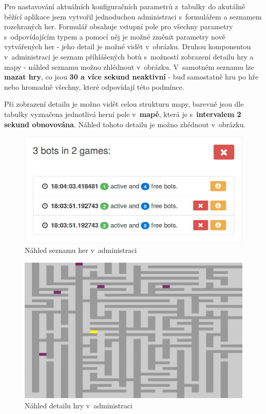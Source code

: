 Pro nastavování aktuálních konfiguračních parametrů z~tabulky do akutálně běžící aplikace jsem vytvořil jednoduchou administraci s~formulářem a seznamem rozehraných her. Formulář obsahuje vstupní pole pro všechny parametry s~odpovídajícím typem a pomocí něj je možné změnit parametry nově vytvářených her - jeho detail je možné vidět v~obrázku. Druhou komponentou v~administraci je seznam příhlášených botů s~možností zobrazení detailu hry a mapy - náhled seznamu možno zhlédnout v~obrázku. V~samotném seznamu lze \textbf{mazat hry}, co jsou \textbf{30 a více sekund neaktivní} - buď samostatně hru po hře nebo hromadně všechny, které odpovídají této podmínce.

Při zobrazení detailu je možno vidět celou strukturu mapy, barevně jsou dle tabulky vyznačena jednotlivá herní pole v~\textbf{mapě}, která je s~\textbf{intervalem 2 sekund obnovována}. Náhled tohoto detailu je možno zhédnout v~obrázku.

\begin{figure}[H]
	\centering
	\includegraphics{assets/admin-games-list}
	\caption{Náhled seznamu her v~administraci}
	\label{fig:admin-games-list}
\end{figure}

\begin{figure}[H]
	\centering
	\includegraphics{assets/admin-game-detail}
	\caption{Náhled detailu hry v~administraci}
	\label{fig:admin-game-detail}
\end{figure}

